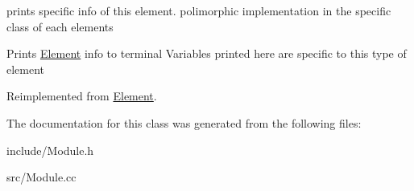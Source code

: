 prints specific info of this element. polimorphic implementation in the specific class of each elements 

Prints \hyperlink{classElement}{Element} info to terminal Variables printed here are specific to this type of element

Reimplemented from \hyperlink{classElement_adef0eb8aa2179a099c38d96217c237c0}{Element}.



The documentation for this class was generated from the following files\+:\begin{DoxyCompactItemize}
\item 
include/Module.\+h\item 
src/Module.\+cc\end{DoxyCompactItemize}
